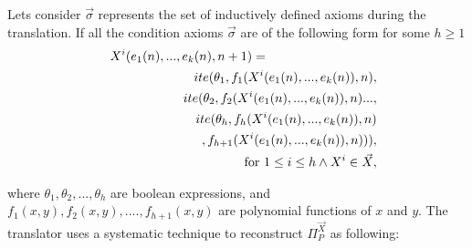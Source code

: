 Lets consider $\vec{\sigma}$ represents the set of inductively defined axioms during the translation. If all the condition axioms $\vec{\sigma}$ are of the following form for some $h\geq1$
\begin{eqnarray}
\hspace*{1em}X^i(e_1(n), ..., e_k(n),n+1) &=& \nonumber\\
&&\hspace*{-12em}ite(\theta_1,f_1(X^i(e_1(n), ..., e_k(n)),n),\nonumber\\
&&\hspace*{-10em}ite(\theta_2,f_2(X^i(e_1(n), ...,e_k(n)),n)...,\nonumber\\ &&\hspace*{-8em}ite(\theta_h,f_h(X^i(e_1(n), ..., e_k(n)),n)\nonumber\\
&&\hspace*{-6em},f_{h+1}(X^i(e_1(n), ..., e_k(n)),n))), \nonumber\\
&&\hspace*{-4em} \mbox{ for }1\leq i\leq h \land X^i \in \vec{X}, \label{rec3}
\end{eqnarray}

where $\theta_1,\theta_2,...,\theta_{h}$ are boolean expressions, and 
$f_1(x,y),f_2(x,y),....,f_{h+1}(x,y)$ are polynomial functions of $x$ and $y$. The translator uses a systematic technique to reconstruct $\Pi_P^{\vec{X}}$ as following:

